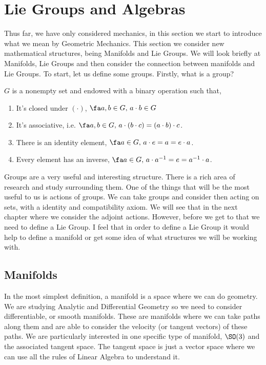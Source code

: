 
\section{Lie Groups and Algebras}

Thus far, we have only considered mechanics, in this section we start to introduce what we mean by Geometric Mechanics. This section we consider new mathematical structures, being Manifolds and Lie Groups. We will look briefly at Manifolds, Lie Groups and then consider the connection between manifolds and Lie Groups. To start, let us define some groups. Firstly, what is a group?
\begin{ndefi}[Group]
  $G$ is a nonempty set and endowed with a binary operation such that,
  \begin{enumerate}
    \item It's closed under $(\cdot)$, $\fa a, b \in G,\, a \cdot b \in G$
    \item It's associative, i.e. $\fa a, b \in G,\,a \cdot ( b \cdot c) = (a \cdot b) \cdot c$.
    \item There is an identity element, $\fa a \in G,\, a \cdot e = a = e \cdot a$.
    \item Every element has an inverse, $\fa a \in G,\,a \cdot a^{-1} = e = a^{-1} \cdot a$.
  \end{enumerate}
\end{ndefi}

\noindent
Groups are a very useful and interesting structure. There is a rich area of research and study surrounding them. One of the things that will be the most useful to us is actions of groups. We can take groups and consider then acting on sets, with a identity and compatibility axiom. We will see that in the next chapter where we consider the adjoint actions. However, before we get to that we need to define a Lie Group. I feel that in order to define a Lie Group it would help to define a manifold or get some idea of what structures we will be working with.

\subsection{Manifolds}
In the most simplest definition, a manifold is a space where we can do geometry. We are studying Analytic and Differential Geometry so we need to consider differentiable, or smooth manifolds. These are manifolds where we can take paths along them and are able to consider the velocity (or tangent vectors) of these paths. We are particularly interested in one specific type of manifold, $\SO(3)$ and the associated tangent space. The tangent space is just a vector space where we can use all the rules of Linear Algebra to understand it. \\

